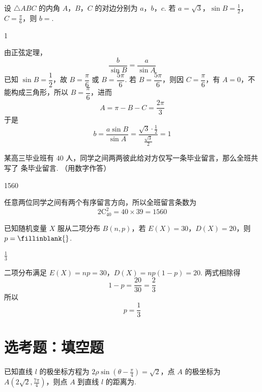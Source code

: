 \begin{problem}
设 \(\triangle ABC\) 的内角 \(A\)，\(B\)，\(C\) 的对边分别为 \(a\)，\(b\)，\(c\). 若 \(a = \sqrt{3}\)，\(\sin B = \frac{1}{2}\)，\(C = \frac{\pi}{6}\)，则 \(b =\)\fillinblank{}.
\end{problem}

\begin{answer}
1
\end{answer}

\begin{solution}
由正弦定理，
\[
\frac{b}{\sin B}=\frac{a}{\sin A}
\]
已知 \(\sin B=\dfrac12\)，故 \(B=\dfrac\pi6\) 或 \(B=\dfrac{5\pi}6\). 若 \(B=\dfrac{5\pi}6\)，则因 \(C=\dfrac\pi6\)，有 \(A=0\)，不能构成三角形，所以 \(B=\dfrac\pi6\)，进而
\[
A=\pi-B-C=\frac{2\pi}{3}
\]
于是
\[
b=\frac{a\sin B}{\sin A}
=\frac{\sqrt3\cdot\frac12}{\frac{\sqrt3}{2}}=1
\]
\end{solution}

\begin{problem}
某高三毕业班有 \(40\) 人，同学之间两两彼此给对方仅写一条毕业留言，那么全班共写了\fillinblank{} 条毕业留言. （用数字作答）
\end{problem}

\begin{answer}
1560
\end{answer}

\begin{solution}
任意两位同学之间有两个有序留言方向，所以全班留言条数为
\[
2\mathrm C_{40}^{2}=40\times39=1560
\]
\end{solution}

\begin{problem}
已知随机变量 \(X\) 服从二项分布 \(B(n,p)\)，若 \(E(X)=30\)，\(D(X)=20\)，则 \(p =\fillinblank{}\).
\end{problem}

\begin{answer}
\(\frac{1}{3}\)
\end{answer}

\begin{solution}
二项分布满足
\(E(X)=np=30\)，\(D(X)=np(1-p)=20\).
两式相除得
\[
1-p=\frac{20}{30}=\frac23
\]
所以
\[
p=\frac13
\]
\end{solution}

\section{选考题：填空题}

\begin{problem}
已知直线 \(l\) 的极坐标方程为 \(2\rho\sin\left(\theta-\frac{\pi}{4}\right)=\sqrt{2}\)，点 \(A\) 的极坐标为 \(A\left(2\sqrt{2},\frac{7\pi}{4}\right)\)，则点 \(A\) 到直线 \(l\) 的距离为\fillinblank{}.
\end{problem}

